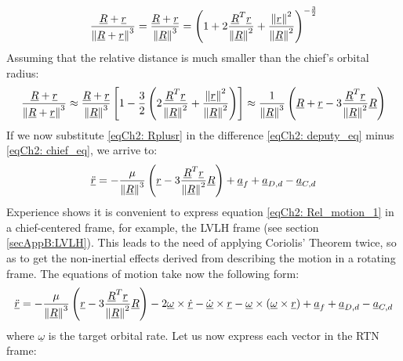 	\[
	\dfrac{\underline{R} + \underline{r}}{\mbox{$\left\lVert \underline{R} + \underline{r} \right\rVert$}^{3}} = \dfrac{\underline{R} + \underline{r}}{\mbox{$\left\lVert \underline{R} \right\rVert$}^{3}} = \left( 1 + 2 \dfrac{\underline{R}^T \underline{r}}{\mbox{$\left\lVert \underline{R} \right\rVert$}^2} + \dfrac{\mbox{$\left\lVert \underline{r} \right\rVert$}^2}{\mbox{$\left\lVert \underline{R} \right\rVert$}^2} \right)^{-\frac{3}{2}}
	\]
	\indent Assuming that the relative distance is much smaller than the chief's orbital radius:
	\begin{equation}
	\dfrac{\underline{R} + \underline{r}}{\mbox{$\left\lVert \underline{R} + \underline{r} \right\rVert$}^{3}} \approx \dfrac{\underline{R} + \underline{r}}{\mbox{$\left\lVert \underline{R} \right\rVert$}^{3}} \left[1 - \frac{3}{2} \left( 2 \dfrac{\underline{R}^T \underline{r}}{\mbox{$\left\lVert \underline{R} \right\rVert$}^2} + \dfrac{\mbox{$\left\lVert \underline{r} \right\rVert$}^2}{\mbox{$\left\lVert \underline{R} \right\rVert$}^2} \right) \right] \approx  \dfrac{1}{\mbox{$\left\lVert \underline{R} \right\rVert$}^{3}} \left(\underline{R} + \underline{r} - 3 \dfrac{\underline{R}^T \underline{r}}{\mbox{$\left\lVert \underline{R} \right\rVert$}^2} \underline{R} \right)
	\label{eqCh2: 	Rplusr}
	\end{equation}
	\indent If we now substitute \eqref{eqCh2: 	Rplusr} in the difference \eqref{eqCh2:	deputy_eq} minus \eqref{eqCh2:	chief_eq}, we arrive to:
	\begin{equation}
	\underline{\ddot{r}} = - \dfrac{\mu}{\mbox{$\left\lVert \underline{R} \right\rVert$}^3} \left(\underline{r} - 3 \dfrac{\underline{R}^T \underline{r}}{\mbox{$\left\lVert \underline{R} \right\rVert$}^2} \underline{R} \right) + \underline{a}_f + \underline{a}_{D, d} - \underline{a}_{C, d}
	\label{eqCh2: 	Rel_motion_1}
	\end{equation}
	\indent Experience shows it is convenient to express equation \eqref{eqCh2: 	Rel_motion_1} in a chief-centered frame, for example, the LVLH frame (see section \ref{secAppB:LVLH}). This leads to the need of applying Coriolis' Theorem twice, so as to get the non-inertial effects derived from describing the motion in a rotating frame. The equations of motion take now the following form:
	\begin{equation}
	\underline{\ddot{r}} = - \dfrac{\mu}{\mbox{$\left\lVert \underline{R} \right\rVert$}^3} \left(\underline{r} - 3 \dfrac{\underline{R}^T \underline{r}}{\mbox{$\left\lVert \underline{R} \right\rVert$}^2} \underline{R} \right) - 2 \underline{\omega}\times  \underline{\dot{r}} - \underline{\dot{\omega}}\times \underline{r} - \underline{\omega}\times \left( \underline{\omega} \times \underline{r}\right) + \underline{a}_f + \underline{a}_{D, d} - \underline{a}_{C, d}
	\label{eqCh2: 	Rel_motion_2}
	\end{equation}
	\noindent where $\underline{\omega}$ is the target orbital rate. Let us now express each vector in the RTN frame:
